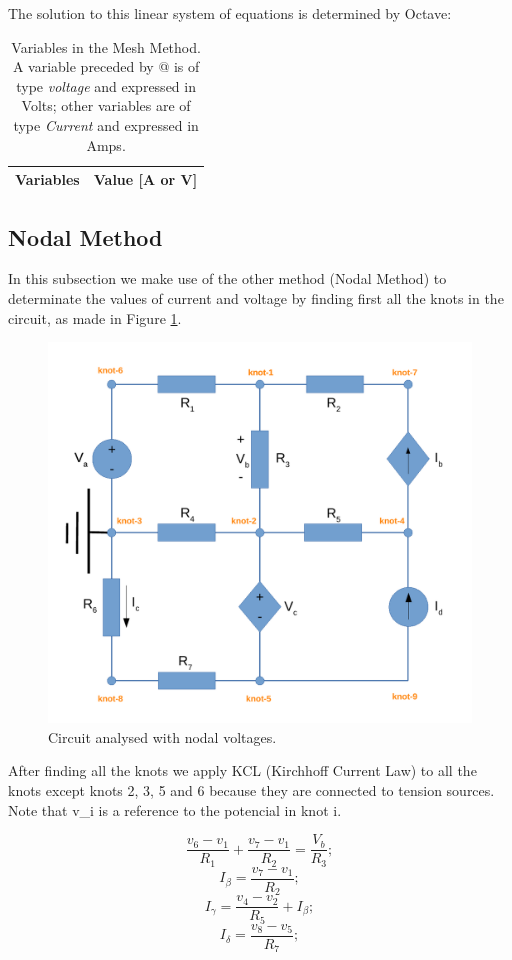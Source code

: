 The solution to this linear system of equations is determined by Octave:

\begin{table}[h]
  \centering
  \begin{tabular}{|l|r|}
    \hline    
    {\bf Variables} & {\bf Value [A or V]} \\ \hline
    
  \end{tabular}
  \caption{Variables in the Mesh Method. A variable preceded by @ is of type {\em voltage} and expressed in Volts; other variables are of type {\em Current} and expressed in Amps.}
  \label{tab:malhas}
\end{table}

\subsection{Nodal Method}

In this subsection we make use of the other method (Nodal Method) to determinate the values of current and voltage by finding first all the knots in the circuit, as made in Figure \ref{fig:Circuit_Nodal}.

\begin{figure}[H] 
\centering
\includegraphics[width=0.5\linewidth]{CircuitNodal.pdf}
\caption{Circuit analysed with nodal voltages.}
\label{fig:Circuit_Nodal}
\end{figure}

After finding all the knots we apply KCL (Kirchhoff Current Law) to all the knots except knots 2, 3, 5 and 6 because they are connected to tension sources.
Note that v_i is a reference to the potencial in knot i.

\begin{equation}
  \frac{v_6-v_1}{R_1} + \frac{v_7-v_1}{R_2} = \frac{V_b}{R_3};
\end{equation}
\begin{equation}
  I_{\beta} = \frac{v_7-v_1}{R_2};	
\end{equation}
\begin{equation}
  I_{\gamma} = \frac{v_4-v_2}{R_5}+I_{\beta};
\end{equation}
\begin{equation}
  I_{\delta} = \frac{v_8-v_5}{R_7};
\end{equation}

